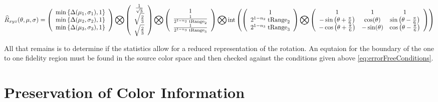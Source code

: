 \begin{equation}
\widehat{R}_{xyz}(\theta,\mu,\sigma) =
\left(
\begin{array}{c}
\min\left\{\Delta(\mu_1,\sigma_1), 1 \right\} \\
\min\left\{\Delta(\mu_2,\sigma_2), 1 \right\}  \\
\min\left\{\Delta(\mu_3,\sigma_3), 1 \right\}  \\
\end{array}
\right)
\bigotimes
\left(
\begin{array}{c}
 \frac{1}{\sqrt{3}} \\
 \sqrt{\frac{2}{3}}  \\
 \sqrt{\frac{2}{3}} \\
\end{array}
\right) \bigotimes
\left(
\begin{array}{c}
 1 \\
 \frac{1}{2^{1-n_2} \; \text{tRange}_2} \\
 \frac{1}{2^{1-n_3} \; \text{tRange}_3} \\
\end{array}
\right) 
\bigotimes
\text{int}\left(
\left(
\begin{array}{c}
 1 \\
 2^{1-n_2} \; \text{tRange}_2\\
 2^{1-n_3} \; \text{tRange}_3 \\
\end{array}
\right) 
\bigotimes
\left(
\begin{array}{ccc}
 1 & 1 & 1 \\
 -\sin \left(\theta +\frac{\pi}{6}\right) &  \cos (\theta ) &  \sin \left(\theta -\frac{\pi}{6}\right) \\
 -\cos \left(\theta +\frac{\pi}{6}\right) & - \sin (\theta ) & \cos \left(\theta -\frac{\pi}{6}\right) \\
\end{array}
\right)
\right)
\end{equation}

All that remains is to determine if the statistics allow for a reduced representation of the rotation. An equtaion for the boundary of the one to one fidelity region must be found in the source color space and then checked against the conditions given above \ref{eq:errorFreeConditions}. 

\section{Preservation of Color Information}\label{sec:PreservationOfColorInformation}

